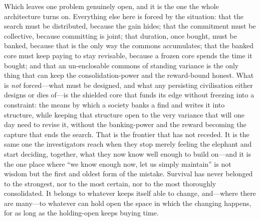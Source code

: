 \documentclass{article}
\begin{document}
Which leaves one problem genuinely open, and it is the one the whole architecture turns on. Everything else here is forced by the situation: that the search must be distributed, because the gain hides; that the commitment must be collective, because committing is joint; that duration, once bought, must be banked, because that is the only way the commons accumulates; that the banked core must keep paying to stay revisable, because a frozen core spends the time it bought; and that an un-enclosable commons of standing variance is the only thing that can keep the consolidation-power and the reward-bound honest. What is \textit{not} forced---what must be designed, and what any persisting civilisation either designs or dies of---is the shielded core that funds its edge without freezing into a constraint: the means by which a society banks a find and writes it into structure, while keeping that structure open to the very variance that will one day need to revise it, without the banking-power and the reward becoming the capture that ends the search. That is the frontier that has not receded. It is the same one the investigators reach when they stop merely feeling the elephant and start deciding, together, what they now know well enough to build on---and it is the one place where ``we know enough now, let us simply maintain'' is not wisdom but the first and oldest form of the mistake. Survival has never belonged to the strongest, nor to the most certain, nor to the most thoroughly consolidated. It belongs to whatever keeps itself able to change, and---where there are many---to whatever can hold open the space in which the changing happens, for as long as the holding-open keeps buying time.
\end{document}

